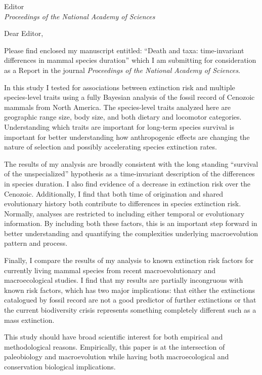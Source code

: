 \documentclass{letter}
\begin{document}
\begin{letter}{Editor \\ \textit{Proceedings of the National Academy of Sciences}}
  \opening{Dear Editor,}

  Please find enclosed my manuscript entitled: ``Death and taxa: time-invariant differences in mammal species duration'' which I am submitting for consideration as a Report in the journal \textit{Proceedings of the National Academy of Sciences}.

  In this study I tested for associations between extinction risk and multiple species-level traits using a fully Bayesian analysis of the fossil record of Cenozoic mammals from North America. The species-level traits analyzed here are geographic range size, body size, and both dietary and locomotor categories. Understanding which traits are important for long-term species survival is important for better understanding how anthropogenic effects are changing the nature of selection and possibly accelerating species extinction rates.
  
  The results of my analysis are broadly consistent with the long standing ``survival of the unspecialized'' hypothesis as a time-invariant description of the differences in species duration. I also find evidence of a decrease in extinction risk over the Cenozoic. Additionally, I find that both time of origination and shared evolutionary history both contribute to differences in species extinction risk. Normally, analyses are restricted to including either temporal or evolutionary information. By including both these factors, this is an important step forward in better understanding and quantifying the complexities underlying macroevolution pattern and process.
  
  Finally, I compare the results of my analysis to known extinction risk factors for currently living mammal species from recent macroevolutionary and macroecological studies. I find that my results are partially incongruous with known risk factors, which has two major implications: that either the extinctions catalogued by fossil record are not a good predictor of further extinctions or that the current biodiversity crisis represents something completely different such as a mass extinction.

  This study should have broad scientific interest for both empirical and methodological reasons. Empirically, this paper is at the intersection of paleobiology and macroevolution while having both macroecological and conservation biological implications. 


\end{letter}
\end{document}
